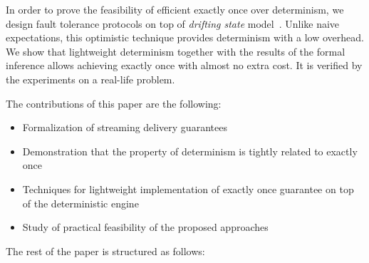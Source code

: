 In order to prove the feasibility of efficient exactly once over determinism, we design fault tolerance protocols on top of {\em drifting state} model~\cite{we2018adbis}. Unlike naive expectations, this optimistic technique provides determinism with a low overhead. We show that lightweight determinism together with the results of the formal inference allows achieving exactly once with almost no extra cost. It is verified by the experiments on a real-life problem.

The contributions of this paper are the following: 
\begin{itemize}
    \item Formalization of streaming delivery guarantees 
    \item Demonstration that the property of determinism is tightly related to exactly once
    \item Techniques for lightweight implementation of exactly once guarantee on top of the deterministic engine
    \item Study of practical feasibility of the proposed approaches
\end{itemize}

The rest of the paper is structured as follows: 
